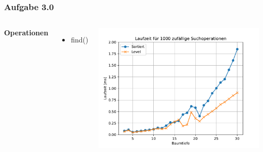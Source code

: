 \documentclass[aspectratio=169]{beamer}
\begin{document}
\begin{frame}
\frametitle{Aufgabe 3.0}
\begin{columns}[c] %
	
	\textbf{Operationen}
	\begin{itemize}
		\item find()
	\end{itemize}
	
	\includegraphics[scale=.6]{Figure_3.pdf}
	
	
\end{columns}
\end{frame}

\end{document}
